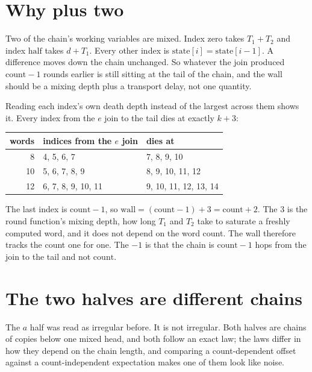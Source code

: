 \section{Why plus two}

Two of the chain's working variables are mixed. Index zero takes \(T_1 + T_2\) and index \(\mathrm{half}\) takes \(d + T_1\). Every other index is \(\mathrm{state}[i] = \mathrm{state}[i-1]\). A difference moves down the chain unchanged. So whatever the join produced \(\mathrm{count} - 1\) rounds earlier is still sitting at the tail of the chain, and the wall should be a mixing depth plus a transport delay, not one quantity.

Reading each index's own death depth instead of the largest across them shows it. Every index from the \(e\) join to the tail dies at exactly \(k + 3\):

\begin{center}
\begin{tabular}{rll}
\toprule
words & indices from the \(e\) join & dies at \\
\midrule
8 & 4, 5, 6, 7 & 7, 8, 9, 10 \\
10 & 5, 6, 7, 8, 9 & 8, 9, 10, 11, 12 \\
12 & 6, 7, 8, 9, 10, 11 & 9, 10, 11, 12, 13, 14 \\
\bottomrule
\end{tabular}
\end{center}

The last index is \(\mathrm{count} - 1\), so \(\mathrm{wall} = (\mathrm{count} - 1) + 3 = \mathrm{count} + 2\). The \(3\) is the round function's mixing depth, how long \(T_1\) and \(T_2\) take to saturate a freshly computed word, and it does not depend on the word count. The wall therefore tracks the count one for one. The \(-1\) is that the chain is \(\mathrm{count} - 1\) hops from the join to the tail and not \(\mathrm{count}\).

\section{The two halves are different chains}

The \(a\) half was read as irregular before. It is not irregular. Both halves are chains of copies below one mixed head, and both follow an exact law; the laws differ in how they depend on the chain length, and comparing a count-dependent offset against a count-independent expectation makes one of them look like noise.

